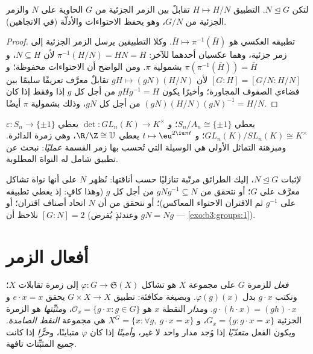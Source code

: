\begin{theorem}\label{thm:b3:groups:correspondence}
لتكن $N \trianglelefteq G$. التطبيق $H \mapsto H/N$ تقابلٌ بين الزمر
الجزئية من $G$ الحاوية على $N$ والزمر الجزئية من $G/N$، وهو يحفظ
الاحتواءات والأدلّة  (في الاتجاهين).
\end{theorem}

\begin{proof}
تطبيقه العكسي هو $\bar H \mapsto \pi^{-1}(\bar H)$. وكلا التطبيقين يرسل
الزمر الجزئية إلى زمر جزئية، وهما عكسيان أحدهما للآخر: $\pi^{-1}(H/N) =
HN = H$
لأن $N \subseteq H$، و $\pi(\pi^{-1}(\bar H)) = \bar H$
بشمولية $\pi$. ومن الواضح أن الاحتواءات محفوظة؛ و $[G:H] = [G/N : H/N]$ لأن $gH \mapsto (gN)(H/N)$ تقابلٌ
معرَّف تعريفًا سليمًا بين فضاءي الصفوف المجاورة؛ وأخيرًا يكون
$gHg^{-1} = H$ من أجل كل $g$ إذا وفقط إذا كان $(gN)(H/N)(gN)^{-1} = H/N$ من أجل
كل $gN$، وذلك بشمولية $\pi$ أيضًا.
\end{proof}

\begin{example}\label{ex:b3:groups:firstiso}
$\varepsilon \colon S_n \to \{\pm 1\}$ يعطي $S_n/A_n \cong
\{\pm1\}$؛ و $\det \colon GL_n(K) \to K^\times$ يعطي
$GL_n(K)/SL_n(K) \cong K^\times$؛ و $t \mapsto \eu^{2\iu\pi t}$ يعطي
$\R/\Z \cong \mathbb U$، وهي زمرة الدائرة. ومبرهنة التماثل الأولى هي
الوسيلة التي تُحسب بها زمر القسمة \emph{عمليًا}: نبحث عن تطبيق شامل
له النواة المطلوبة.
\end{example}

\begin{method}\label{met:b3:groups:normal}
لإثبات $N \trianglelefteq G$، إليك الطرائق مرتّبة تنازليًا حسب أناقتها:
نُظهر $N$ على أنها نواة تشاكل معرَّف على $G$؛ أو نتحقق من
$gNg^{-1} \subseteq N$ من أجل كل $g$ (وهذا كافٍ: إذ يعطي تطبيقه على
$g^{-1}$ ثم الاقتران الاحتواء المعاكس)؛ أو نتحقق من أن $N$ اتحاد
أصناف اقتران؛ أو نلاحظ أن $[G:N] = 2$ (وعندئذٍ يُفرض $gN = Ng$ ---
\cref{exo:b3:groups:1}).
\end{method}

\section{أفعال الزمر}

\begin{definition}\label{def:b3:groups:action}
\emph{فعل} للزمرة $G$ على مجموعة $X$ هو تشاكل
$\varphi \colon G \to \mathfrak{S}(X)$ إلى زمرة تقابلات $X$؛ ونكتب $g \cdot x$ بدل
$\varphi(g)(x)$. وبصيغة مكافئة: تطبيق $G \times X \to X$ يحقق $e \cdot x = x$
و $g
\cdot (h \cdot x) = (gh) \cdot x$. و\emph{مدار} النقطة
$x$ هو $\mathcal O_x = \{g \cdot x : g \in G\}$، و\emph{مثبِّتها} هو
الزمرة الجزئية $G_x = \{g :
g\cdot x = x\}$، و $X^G = \{x : \forall g,\ g \cdot x = x\}$ هي
مجموعة \emph{النقط الصامدة}. ويكون الفعل \emph{متعدّيًا} إذا وُجد
مدار واحد لا غير، و\emph{أمينًا} إذا كان $\varphi$ متباينًا،
و\emph{حرًّا} إذا كانت جميع المثبِّتات تافهة.
\end{definition}

